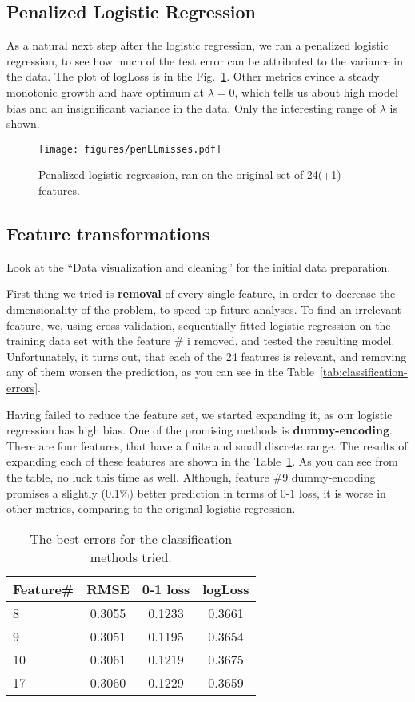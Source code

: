 \documentclass{article} %
\begin{document}
\subsection{Penalized Logistic Regression}
As a natural next step after the logistic regression, we ran a penalized logistic regression, to see how much of the test error can be attributed to the variance in the data. The plot of logLoss is in the Fig.~\ref{fig:penLLmisses}. Other metrics evince a steady monotonic growth and have optimum at $\lambda = 0$, which tells us about high model bias and an insignificant variance in the data. Only the interesting range of $\lambda$ is shown.

\begin{figure}[h]
\center
\texttt{[image: figures/penLLmisses.pdf]}
\caption{Penalized logistic regression, ran on the original set of 24(+1) features.}
\label{fig:penLLmisses}
\end{figure}

\subsection{Feature transformations}
Look at the ``Data visualization and cleaning'' for the initial data preparation.

First thing we tried is {\bf removal} of every single feature, in order to decrease the dimensionality of the problem, to speed up future analyses. To find an irrelevant feature, we, using cross validation, sequentially fitted logistic regression on the training data set with the feature \# i removed, and tested the resulting model. Unfortunately, it turns out, that each of the 24 features is relevant, and removing any of them worsen the prediction, as you can see in the Table~\ref{tab:classification-errors}.

Having failed to reduce the feature set, we started expanding it, as our logistic regression has high bias. One of the promising methods is {\bf dummy-encoding}. There are four features, that have a finite and small discrete range. The results of expanding each of these features are shown in the Table~\ref{tab:classification-dummy}. As you can see from the table, no luck this time as well. Although, feature \#9 dummy-encoding promises a slightly (0.1\%) better prediction in terms of 0-1 loss, it is worse in other metrics, comparing to the original logistic regression.
\begin{table}[h]
  \begin{center}
    \begin{tabular}{l|ccc}
      Feature\# & RMSE & 0-1 loss & logLoss \\
      \hline
      8 & 0.3055 & 0.1233 & 0.3661 \\
      9 & 0.3051 & 0.1195 & 0.3654 \\
      10 & 0.3061 & 0.1219 & 0.3675 \\
      17 & 0.3060 & 0.1229 & 0.3659
    \end{tabular}
    \caption{The best errors for the classification methods tried.}
    \label{tab:classification-dummy}
  \end{center}
\end{table}
\end{document}
